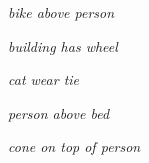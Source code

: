 \documentclass[10pt,twocolumn,letterpaper]{article}
\begin{document}
\begin{figure*}[t]
\centering
	\begin{minipage}[t]{0.005\textwidth}
    	\centering
    	\vspace{0.6ex}
    \end{minipage}
    \hspace{0.01\textwidth}
	\begin{minipage}[t]{0.18\textwidth}
    	\centering
    	\emph{{\color{blue}bike} above {\color{red}person}}\\
    	\vspace{0.2ex}
	\end{minipage}
	\hspace{0.005\textwidth}
	\begin{minipage}[t]{0.18\textwidth}
    	\centering
    \emph{{\color{blue}building} has {\color{red}wheel}}\\
    	\vspace{0.2ex}
	\end{minipage}
	\hspace{0.005\textwidth}
	\begin{minipage}[t]{0.18\textwidth}
    \centering
    	\emph{{\color{blue}cat} wear {\color{red}tie}}\\
    	\vspace{0.2ex}
	\end{minipage}
	\hspace{0.005\textwidth}
	\begin{minipage}[t]{0.18\textwidth}
    \centering
    	\emph{{\color{blue}person} above {\color{red}bed}}\\
    	\vspace{0.2ex}
	\end{minipage}
	\hspace{0.005\textwidth}
	\begin{minipage}[t]{0.18\textwidth}
    \centering
    	\emph{{\color{blue}cone} on top of {\color{red}person}}\\
    	\vspace{0.2ex}
	\end{minipage}	
	

\end{figure*}
\end{document}
